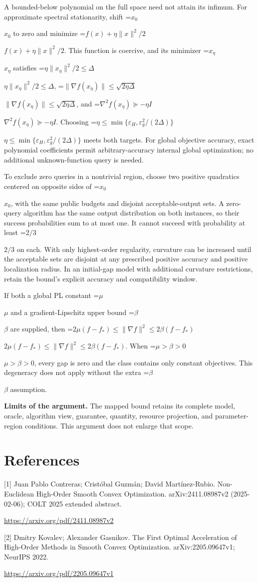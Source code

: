 \documentclass[10pt,a4paper]{article}
\newcommand{\AtlasMath}[1]{\par\begingroup\centering\setbox0=\hbox{$\displaystyle #1$}\ifdim\wd0>1.4\linewidth\typeout{ATLAS WIDE FORMULA: \the\wd0}\fi\ifdim\wd0>\linewidth\resizebox{\linewidth}{!}{\box0}\else\box0\fi\par\endgroup}
\newcommand{\AtlasInlineMath}[1]{\begingroup\setbox0=\hbox{$#1$}\ifdim\wd0>.4\linewidth\endgroup\AtlasMath{#1}\else\endgroup$#1$\fi}
\begin{document}
A bounded-below polynomial on the full space need not attain its infimum. For approximate spectral stationarity, shift \AtlasInlineMath{x_0} to zero and minimize \AtlasInlineMath{f(x)+\eta\|x\|^2/2}. This function is coercive, and its minimizer \AtlasInlineMath{x_\eta} satisfies \AtlasInlineMath{\eta\|x_\eta\|^2/2\le\Delta}, \AtlasInlineMath{\|\nabla f(x_\eta)\|\le\sqrt{2\eta\Delta}}, and \AtlasInlineMath{\nabla^2f(x_\eta)\succeq-\eta I}. Choosing \AtlasInlineMath{\eta\le\min\{\varepsilon_H,\varepsilon_g^2/(2\Delta)\}} meets both targets. For global objective accuracy, exact polynomial coefficients permit arbitrary-accuracy internal global optimization; no additional unknown-function query is needed.

To exclude zero queries in a nontrivial region, choose two positive quadratics centered on opposite sides of \AtlasInlineMath{x_0}, with the same public budgets and disjoint acceptable-output sets. A zero-query algorithm has the same output distribution on both instances, so their success probabilities sum to at most one. It cannot succeed with probability at least \AtlasInlineMath{2/3} on each. With only highest-order regularity, curvature can be increased until the acceptable sets are disjoint at any prescribed positive accuracy and positive localization radius. In an initial-gap model with additional curvature restrictions, retain the bound's explicit accuracy and compatibility window.

If both a global PL constant \AtlasInlineMath{\mu} and a gradient-Lipschitz upper bound \AtlasInlineMath{\beta} are supplied, then \AtlasInlineMath{2\mu(f-f_*)\le\|\nabla f\|^2\le2\beta(f-f_*)}. When \AtlasInlineMath{\mu>\beta>0}, every gap is zero and the class contains only constant objectives. This degeneracy does not apply without the extra \AtlasInlineMath{\beta} assumption.

\textbf{Limits of the argument.} The mapped bound retains its complete model, oracle, algorithm view, guarantee, quantity, resource projection, and parameter-region conditions. This argument does not enlarge that scope.

\section{References}
[1] Juan Pablo Contreras; Cristóbal Guzmán; David Martínez-Rubio. Non-Euclidean High-Order Smooth Convex Optimization. arXiv:2411.08987v2 (2025-02-06); COLT 2025 extended abstract.

\url{https://arxiv.org/pdf/2411.08987v2}

[2] Dmitry Kovalev; Alexander Gasnikov. The First Optimal Acceleration of High-Order Methods in Smooth Convex Optimization. arXiv:2205.09647v1; NeurIPS 2022.

\url{https://arxiv.org/pdf/2205.09647v1}
\end{document}

